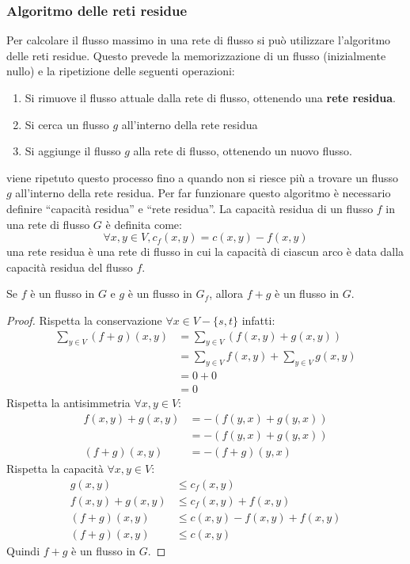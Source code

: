     \subsubsection{Algoritmo delle reti residue}
        Per calcolare il flusso massimo in una rete di flusso si può utilizzare l'algoritmo delle reti residue. Questo prevede la memorizzazione di un flusso (inizialmente nullo) e la ripetizione delle seguenti operazioni:
        \begin{enumerate}
            \item Si rimuove il flusso attuale dalla rete di flusso, ottenendo una \textbf{rete residua}.
            \item Si cerca un flusso $g$ all'interno della rete residua
            \item Si aggiunge il flusso $g$ alla rete di flusso, ottenendo un nuovo flusso.
        \end{enumerate}
        viene ripetuto questo processo fino a quando non si riesce più a trovare un flusso $g$ all'interno della rete residua.\newline
        Per far funzionare questo algoritmo è necessario definire ``capacità residua'' e ``rete residua''. La capacità residua di un flusso $f$ in una rete di flusso $G$ è definita come:
        $$
            \forall x,y\in V, c_f(x,y) = c(x,y) - f(x,y)
        $$
        una rete residua è una rete di flusso in cui la capacità di ciascun arco è data dalla capacità residua del flusso $f$.
        \begin{theorem}
            Se $f$ è un flusso in $G$ e $g$ è un flusso in $G_f$, allora $f+g$ è un flusso in $G$.
        \end{theorem}
        \begin{proof}
            Rispetta la conservazione $\forall x\in V-\{s,t\}$ infatti:
            \begin{align*}
                \sum_{y\in V} (f+g)(x,y) &= \sum_{y\in V} (f(x,y) + g(x,y)) \\
                &= \sum_{y\in V} f(x,y) + \sum_{y\in V} g(x,y) \\
                &= 0 + 0 \\
                &= 0
            \end{align*}
            Rispetta la antisimmetria $\forall x,y\in V$:
            \begin{align*}
                f(x,y) + g(x,y) &= -(f(y,x) + g(y,x)) \\
                &= -(f(y,x) + g(y,x)) \\
                (f+g)(x,y) &= -(f+g)(y,x)
            \end{align*}
            Rispetta la capacità $\forall x,y\in V$:
            \begin{align*}
                g(x,y) &\leq c_f(x,y) \\
                f(x,y) + g(x,y) &\leq c_f(x,y) + f(x,y) \\
                (f+g)(x,y) &\leq c(x,y) - f(x,y) + f(x,y) \\
                (f+g)(x,y) &\leq c(x,y)
            \end{align*}
            Quindi $f+g$ è un flusso in $G$.
        \end{proof}
